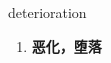 
\begin{frame}
{\huge deterioration}
\begin{center}
\begin{enumerate}\Large
  \item \textbf{恶化，堕落}
\end{enumerate}
\end{center}
\end{frame}

